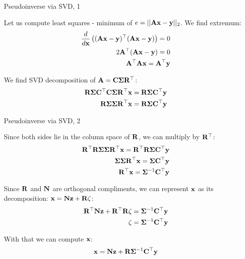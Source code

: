 \documentclass{beamer}
\begin{document}
\begin{frame}{Pseudoinverse via SVD, 1}
	\begin{flushleft}
		
		Let us compute least squares - minimum of $e = ||\mathbf{A}\mathbf{x} - \mathbf{y}||_2$. We find extremum:
		\begin{align}
			\frac{d}{d \mathbf{x}} \left( (\mathbf{A}\mathbf{x} - \mathbf{y})^\top(\mathbf{A}\mathbf{x} - \mathbf{y}) \right) 
			= 0
			\\
			2\mathbf{A}^\top(\mathbf{A}\mathbf{x} - \mathbf{y}) = 0
			\\
			\mathbf{A}^\top\mathbf{A}\mathbf{x} = \mathbf{A}^\top\mathbf{y}
		\end{align}
		
		We find SVD decomposition of $\mathbf{A} = \mathbf{C} \mathbf{\Sigma} \mathbf{R}^\top$:
		\begin{align}
			\mathbf{R}  \mathbf{\Sigma} \mathbf{C}^\top   \mathbf{C} \mathbf{\Sigma} \mathbf{R}^\top \mathbf{x} = \mathbf{R}  \mathbf{\Sigma} \mathbf{C}^\top  \mathbf{y}
			\\
			\mathbf{R}  \mathbf{\Sigma} \mathbf{\Sigma} \mathbf{R}^\top \mathbf{x} = \mathbf{R}  \mathbf{\Sigma} \mathbf{C}^\top  \mathbf{y}
		\end{align}
		
	\end{flushleft}
\end{frame}





\begin{frame}{Pseudoinverse via SVD, 2}
	\begin{flushleft}
		
		Since both sides lie in the column space of $\mathbf{R}$, we can multiply by $\mathbf{R}^\top$:
		\begin{align}
			\mathbf{R}^\top\mathbf{R}  \mathbf{\Sigma} \mathbf{\Sigma} \mathbf{R}^\top \mathbf{x} = \mathbf{R}^\top\mathbf{R}  \mathbf{\Sigma} \mathbf{C}^\top  \mathbf{y}
			\\
			\mathbf{\Sigma} \mathbf{\Sigma} \mathbf{R}^\top \mathbf{x} = \mathbf{\Sigma} \mathbf{C}^\top  \mathbf{y}
			\\
			\mathbf{R}^\top \mathbf{x} = \mathbf{\Sigma}^{-1} \mathbf{C}^\top  \mathbf{y}
		\end{align}
		
		Since $\mathbf{R}$ and $\mathbf{N}$ are orthogonal compliments, we can represent $\mathbf{x}$ as its decomposition: $\mathbf{x} = \mathbf{N}\mathbf{z} + \mathbf{R}\zeta$:
		\begin{align}
			\mathbf{R}^\top \mathbf{N}\mathbf{z} + \mathbf{R}^\top \mathbf{R}\zeta = \mathbf{\Sigma}^{-1} \mathbf{C}^\top  \mathbf{y}
			\\
			\zeta = \mathbf{\Sigma}^{-1} \mathbf{C}^\top  \mathbf{y}
		\end{align}
	
		With that we can compute $\mathbf{x}$:
		\begin{align}
			\mathbf{x} = \mathbf{N}\mathbf{z} + \mathbf{R}\mathbf{\Sigma}^{-1} \mathbf{C}^\top  \mathbf{y}
		\end{align}
		
	\end{flushleft}
\end{frame}
\end{document}
